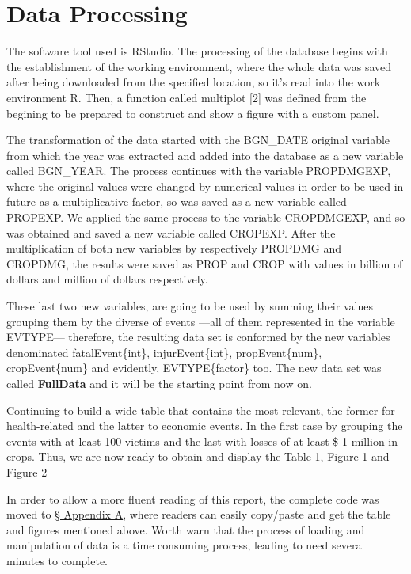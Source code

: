 \documentclass[12pt,spanish, american,b4paper, onecolumn, lmargin=1cm, rmargin=1cm, tmargin=1cm, bmargin=2cm,]{article}
\begin{document}
\section{Data Processing \label{datapro}}\label{data-processing}

The software tool used is RStudio. The processing of the database begins
with the establishment of the working environment, where the whole data
was saved after being downloaded from the specified location, so it's
read into the work environment R. Then, a function called multiplot
{[}2{]} was defined from the begining to be prepared to construct and
show a figure with a custom panel.

The transformation of the data started with the BGN\_DATE original
variable from which the year was extracted and added into the database
as a new variable called BGN\_YEAR. The process continues with the
variable PROPDMGEXP, where the original values were changed by numerical
values in order to be used in future as a multiplicative factor, so was
saved as a new variable called PROPEXP. We applied the same process to
the variable CROPDMGEXP, and so was obtained and saved a new variable
called CROPEXP. After the multiplication of both new variables by
respectively PROPDMG and CROPDMG, the results were saved as PROP and
CROP with values in billion of dollars and million of dollars
respectively.

These last two new variables, are going to be used by summing their
values grouping them by the diverse of events ---all of them represented
in the variable EVTYPE--- therefore, the resulting data set is conformed
by the new variables denominated fatalEvent\{int\}, injurEvent\{int\},
propEvent\{num\}, cropEvent\{num\} and evidently, EVTYPE\{factor\} too.
The new data set was called \textbf{FullData} and it will be the
starting point from now on.

Continuing to build a wide table that contains the most relevant, the
former for health-related and the latter to economic events. In the
first case by grouping the events with at least 100 victims and the last
with losses of at least \$ 1 million in crops. Thus, we are now ready to
obtain and display the Table 1, Figure 1 and Figure 2

In order to allow a more fluent reading of this report, the complete
code was moved to \hyperref[appendix-a]{§ Appendix A}, where readers can
easily copy/paste and get the table and figures mentioned above. Worth
warn that the process of loading and manipulation of data is a time
consuming process, leading to need several minutes to complete.
\end{document}
